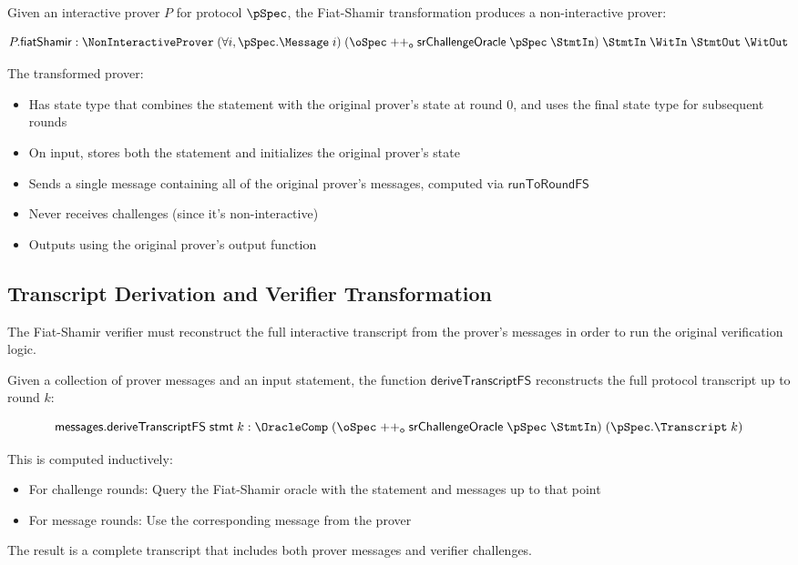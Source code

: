 \begin{definition}
    \label{def:prover_fiat_shamir}
    Given an interactive prover $P$ for protocol $\pSpec$, the Fiat-Shamir transformation produces a non-interactive prover:

    \[ P.\mathsf{fiatShamir} : \NonInteractiveProver \;(\forall i, \pSpec.\Message \;i) \;(\oSpec \mathrel{++_\mathsf{o}} \mathsf{srChallengeOracle} \;\pSpec \;\StmtIn) \;\StmtIn \;\WitIn \;\StmtOut \;\WitOut \]

    The transformed prover:
    \begin{itemize}
        \item Has state type that combines the statement with the original prover's state at round 0, and uses the final state type for subsequent rounds
        \item On input, stores both the statement and initializes the original prover's state
        \item Sends a single message containing all of the original prover's messages, computed via $\mathsf{runToRoundFS}$
        \item Never receives challenges (since it's non-interactive)
        \item Outputs using the original prover's output function
    \end{itemize}
\end{definition}

\subsection{Transcript Derivation and Verifier Transformation}\label{sec:fiat_shamir_verifier}

The Fiat-Shamir verifier must reconstruct the full interactive transcript from the prover's messages in order to run the original verification logic.

\begin{definition}
    \label{def:derive_transcript_fs}
    Given a collection of prover messages and an input statement, the function $\mathsf{deriveTranscriptFS}$ reconstructs the full protocol transcript up to round $k$:

    \[ \mathsf{messages}.\mathsf{deriveTranscriptFS} \;\mathsf{stmt} \;k : \OracleComp \;(\oSpec \mathrel{++_\mathsf{o}} \mathsf{srChallengeOracle} \;\pSpec \;\StmtIn) \;(\pSpec.\Transcript \;k) \]

    This is computed inductively:
    \begin{itemize}
        \item For challenge rounds: Query the Fiat-Shamir oracle with the statement and messages up to that point
        \item For message rounds: Use the corresponding message from the prover
    \end{itemize}

    The result is a complete transcript that includes both prover messages and verifier challenges.
\end{definition}

